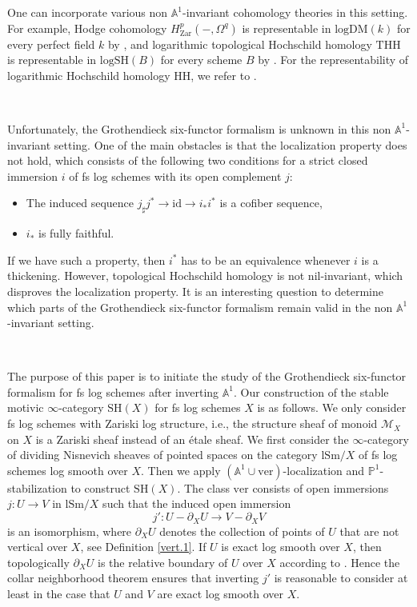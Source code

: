 \documentclass[10pt]{amsart}
\theoremstyle{definition}
\theoremstyle{remark}
\numberwithin{equation}{subsection}
\newcommand{\A}{\mathbb{A}}
\renewcommand{\P}{\mathbb{P}}
\newcommand{\cM}{\mathcal{M}}
\newcommand{\id}{\mathrm{id}}
\newcommand{\SH}{\mathrm{SH}}
\newcommand{\logSH}{\mathrm{logSH}}
\newcommand{\lSm}{\mathrm{lSm}}
\newcommand{\logDM}{\mathrm{log}{\mathrm{DM}}}
\newcommand{\ver}{\mathrm{ver}}
\newcommand{\Zar}{\mathrm{Zar}}
\begin{document}
One can incorporate various non $\A^1$-invariant cohomology theories in this setting.
For example, Hodge cohomology $H_{\Zar}^p(-,\Omega^q)$ is representable in $\logDM(k)$  for every perfect field $k$ by \cite[Theorem 9.7.1]{logDM}, and logarithmic topological Hochschild homology $\mathrm{THH}$ is representable in $\logSH(B)$ for every scheme $B$ by \cite{logSH}.
For the representability of logarithmic Hochschild homology $\mathrm{HH}$, we refer to \cite{BLPO}.

\

Unfortunately, the Grothendieck six-functor formalism is unknown in this non $\A^1$-invariant setting.
One of the main obstacles is that the localization property does not hold, which consists of the following two conditions for a strict closed immersion $i$ of fs log schemes with its open complement $j$:
\begin{itemize}
\item The induced sequence $j_\sharp j^*\to \id \to i_*i^*$ is a cofiber sequence,
\item $i_*$ is fully faithful.
\end{itemize}
If we have such a property, then $i^*$ has to be an equivalence whenever $i$ is a thickening.
However, topological Hochschild homology is not nil-invariant, which disproves the localization property.
It is an interesting question to determine which parts of the Grothendieck six-functor formalism remain valid in the non $\A^1$-invariant setting.

\

The purpose of this paper is to initiate the study of the Grothendieck six-functor formalism for fs log schemes after inverting $\A^1$.
Our construction of the stable motivic $\infty$-category $\SH(X)$ for fs log schemes $X$ is as follows.
We only consider fs log schemes with Zariski log structure, i.e., the structure sheaf of monoid $\cM_X$ on $X$ is a Zariski sheaf instead of an \'etale sheaf.
We first consider the $\infty$-category of dividing Nisnevich sheaves \cite[Definition 3.1.5]{logDM} of pointed spaces on the category $\lSm/X$ of fs log schemes log smooth over $X$.
Then we apply $(\A^1\cup \ver)$-localization and $\P^1$-stabilization to construct $\SH(X)$.
The class $\ver$ consists of open immersions $j\colon U\to V$ in $\lSm/X$ such that the induced open immersion
\[
j'\colon U-\partial_X U\to V-\partial_X V
\]
is an isomorphism, where $\partial_X U$ denotes the collection of points of $U$ that are not vertical over $X$,
see Definition \ref{vert.1}.
If $U$ is exact log smooth over $X$, then topologically $\partial_X U$ is the relative boundary of $U$ over $X$ according to \cite[Theorem 3.7]{zbMATH05809283}.
Hence the collar neighborhood theorem \cite{MR0133812} ensures that inverting $j'$ is reasonable to consider at least in the case that $U$ and $V$ are exact log smooth over $X$.
\end{document}
